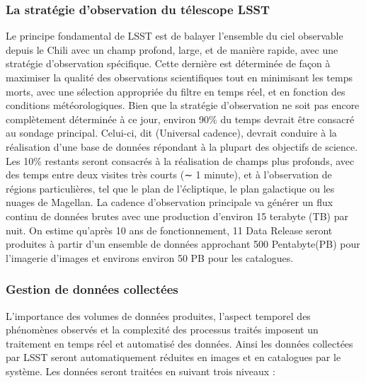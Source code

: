 \subsubsection{La stratégie d'observation du télescope LSST}
Le principe fondamental de LSST est de balayer l'ensemble du ciel observable depuis le Chili avec un champ profond, large, et de manière rapide, avec une stratégie d'observation spécifique. Cette dernière est déterminée de façon à maximiser la qualité des observations scientifiques tout en minimisant les temps morts, avec une sélection appropriée du filtre en temps réel, et en fonction des conditions météorologiques. Bien que la stratégie d'observation ne soit pas encore complètement déterminée à ce jour, environ 90\% du temps devrait être consacré au sondage principal. Celui-ci, dit (Universal cadence), devrait conduire à la réalisation d’une base de données répondant à la plupart des objectifs de science.  Les 10\% restants seront consacrés à la réalisation de champs plus profonds, avec des temps entre deux visites très courts (∼ 1 minute), et à l'observation de régions particulières, tel que le plan de l'écliptique, le plan galactique ou les nuages de Magellan.
La cadence d'observation principale va générer un flux continu de données brutes avec une production d'environ 15 terabyte (TB) par nuit. On estime qu'après 10 ans de fonctionnement, 11 Data Release seront produites à partir d'un ensemble de données approchant 500 Pentabyte(PB) pour l'imagerie d'images et environs environ 50 PB pour les catalogues.
\subsubsection{Gestion de données collectées}
L'importance des volumes de données produites, l'aspect temporel des phénomènes observés et la complexité des processus traités imposent un traitement en temps réel et automatisé des données. Ainsi les données collectées par LSST seront automatiquement réduites en images et en catalogues par le système. Les données seront traitées en suivant trois niveaux :

